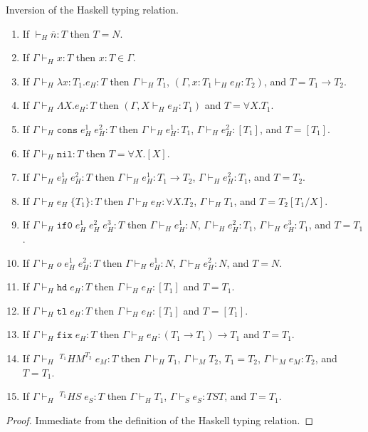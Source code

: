 \begin{hil}
Inversion of the Haskell typing relation.
\begin{enumerate}
\item If $\vdash_{H}\overline{n}:T$ then $T=N$.
\item If $\Gamma\vdash_{H}x:T$ then $x:T\in\Gamma$.
\item If $\Gamma\vdash_{H}\lambda x:T_{1}.e_{H}:T$ then $\Gamma\vdash_{H}T_{1}$, $(\Gamma,x:T_{1}\vdash_{H}e_{H}:T_{2})$, and $T=T_{1}\rightarrow T_{2}$.
\item If $\Gamma\vdash_{H}\Lambda X.e_{H}:T$ then $(\Gamma,X\vdash_{H}e_{H}:T_{1})$ and $T=\forall X.T_{1}$.
\item If $\Gamma\vdash_{H}\mathtt{cons}\;e_{H}^{1}\;e_{H}^{2}:T$ then $\Gamma\vdash_{H}e_{H}^{1}:T_{1}$, $\Gamma\vdash_{H}e_{H}^{2}:[T_{1}]$, and $T=[T_{1}]$.
\item If $\Gamma\vdash_{H}\mathtt{nil}:T$ then $T=\forall X.[X]$.
\item If $\Gamma\vdash_{H}e_{H}^{1}\;e_{H}^{2}:T$ then $\Gamma\vdash_{H}e_{H}^{1}:T_{1}\rightarrow T_{2}$, $\Gamma\vdash_{H}e_{H}^{2}:T_{1}$, and $T=T_{2}$.
\item If $\Gamma\vdash_{H}e_{H}\;\lbrace T_{1}\rbrace:T$ then $\Gamma\vdash_{H}e_{H}:\forall X.T_{2}$, $\Gamma\vdash_{H}T_{1}$, and $T=T_{2}[T_{1}/X]$.
\item If $\Gamma\vdash_{H}\mathtt{if0}\;e_{H}^{1}\;e_{H}^{2}\;e_{H}^{3}:T$ then $\Gamma\vdash_{H}e_{H}^{1}:N$, $\Gamma\vdash_{H}e_{H}^{2}:T_{1}$, $\Gamma\vdash_{H}e_{H}^{3}:T_{1}$, and $T=T_{1}$.
\item If $\Gamma\vdash_{H}o\;e_{H}^{1}\;e_{H}^{2}:T$ then $\Gamma\vdash_{H}e_{H}^{1}:N$, $\Gamma\vdash_{H}e_{H}^{2}:N$, and $T=N$.
\item If $\Gamma\vdash_{H}\mathtt{hd}\;e_{H}:T$ then $\Gamma\vdash_{H}e_{H}:[T_{1}]$ and $T=T_{1}$.
\item If $\Gamma\vdash_{H}\mathtt{tl}\;e_{H}:T$ then $\Gamma\vdash_{H}e_{H}:[T_{1}]$ and $T=[T_{1}]$.
\item If $\Gamma\vdash_{H}\mathtt{fix}\;e_{H}:T$ then $\Gamma\vdash_{H}e_{H}:(T_{1}\rightarrow T_{1})\rightarrow T_{1}$ and $T=T_{1}$.
\item If $\Gamma\vdash_{H}\;^{T_{1}}HM^{T_{2}}\;e_{M}:T$ then $\Gamma\vdash_{H}T_{1}$, $\Gamma\vdash_{M}T_{2}$, $T_{1}=T_{2}$, $\Gamma\vdash_{M}e_{M}:T_{2}$, and $T=T_{1}$.
\item If $\Gamma\vdash_{H}\;^{T_{1}}HS\;e_{S}:T$ then $\Gamma\vdash_{H}T_{1}$, $\Gamma\vdash_{S}e_{S}:TST$, and $T=T_{1}$.
\end{enumerate}
\begin{proof}
Immediate from the definition of the Haskell typing relation.
\end{proof}
\end{hil}
